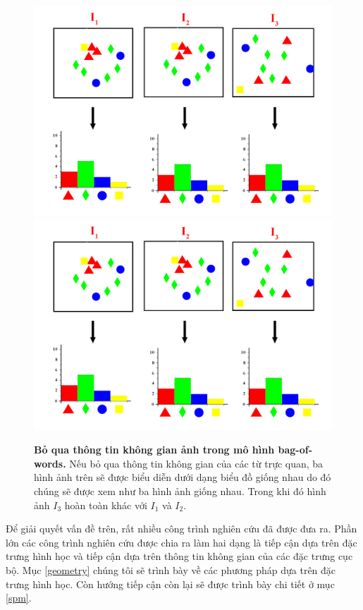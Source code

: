 \begin{figure}[!htbp]
  \begin{center}
    \leavevmode
    \ifpdf
      \includegraphics[scale=0.2]{example}
    \else
      \includegraphics[scale=0.2]{example}
    \fi
    \caption[Bỏ qua thông tin không gian ảnh trong mô hình bag-of-words]{\textbf{Bỏ qua thông tin không gian ảnh trong mô hình bag-of-words.} Nếu bỏ qua thông tin không gian của các từ trực quan, ba hình ảnh trên sẽ được biểu diễn dưới dạng biểu đồ giống nhau do đó chúng sẽ được xem như ba hình ảnh giống nhau. Trong khi đó hình ảnh $I_3$ hoàn toàn khác với $I_1$ và $I_2$.}
    \label{FigExample}
  \end{center}
\end{figure}

Để giải quyết vấn đề trên, rất nhiều công trình nghiên cứu đã được đưa ra. Phần lớn các công trình nghiên cứu được chia ra làm hai dạng là tiếp cận dựa trên đặc trưng hình học và tiếp cận dựa trên thông tin không gian của các đặc trưng cục bộ. Mục \ref{geometry} chúng tôi sẽ trình bày về các phương pháp dựa trên đặc trưng hình học. Còn hướng tiếp cận còn lại sẽ được trình bày chi tiết ở mục \ref{spm}.
